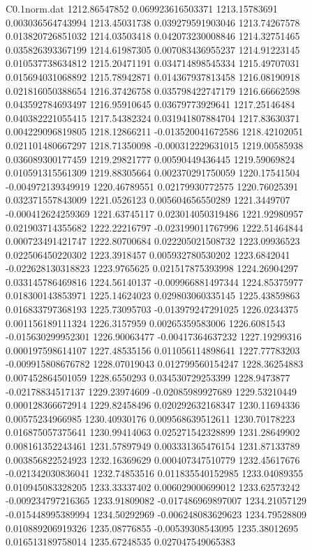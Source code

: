 \begin{filecontents}{C0.1norm.dat}
1212.86547852		0.069923616503371
1213.15783691		0.003036564743994
1213.45031738		0.039279591903046
1213.74267578		0.013820726851032
1214.03503418		0.042073230008846
1214.32751465		0.035826393367199
1214.61987305		0.007083436955237
1214.91223145		0.010537738634812
1215.20471191		0.034714898545334
1215.49707031		0.015694031068892
1215.78942871		0.014367937813458
1216.08190918		0.021816050388654
1216.37426758		0.035798422747179
1216.66662598		0.043592784693497
1216.95910645		0.03679773929641
1217.25146484		0.040382221055415
1217.54382324		0.031941807884704
1217.83630371		0.004229096819805
1218.12866211		-0.013520041672586
1218.42102051		0.021101480667297
1218.71350098		-0.000312229631015
1219.00585938		0.036089300177459
1219.29821777		0.00590449436445
1219.59069824		0.010591315561309
1219.88305664		0.002370291750059
1220.17541504		-0.004972139349919
1220.46789551		0.02179930772575
1220.76025391		0.032371557843009
1221.0526123		0.005604656550289
1221.3449707		-0.000412624259369
1221.63745117		0.023014050319486
1221.92980957		0.021903714355682
1222.22216797		-0.023199011767996
1222.51464844		0.000723491421747
1222.80700684		0.022205021508732
1223.09936523		0.022506450220302
1223.3918457		0.005932780530202
1223.6842041		-0.022628130318823
1223.9765625		0.021517875393998
1224.26904297		0.033145786469816
1224.56140137		-0.009966881497344
1224.85375977		0.018300143853971
1225.14624023		0.029803060335145
1225.43859863		0.016833797368193
1225.73095703		-0.013979247291025
1226.0234375		0.001156189111324
1226.3157959		0.00265359583006
1226.6081543		-0.015630299952301
1226.90063477		-0.00417364637232
1227.19299316		0.000197598614107
1227.48535156		0.011056114898641
1227.77783203		-0.009915808676782
1228.07019043		0.012799560154247
1228.36254883		0.007452864501059
1228.6550293		0.034530729253399
1228.9473877		-0.02178834517137
1229.23974609		-0.02085989927689
1229.53210449		0.000128366672914
1229.82458496		0.020292632168347
1230.11694336		0.00575234966985
1230.40930176		0.009568639512611
1230.70178223		0.016875057375641
1230.99414063		0.025271542328899
1231.28649902		0.008161352243461
1231.57897949		0.003331365476154
1231.87133789		0.003856822524923
1232.16369629		0.000407347510779
1232.45617676		-0.021342030836041
1232.74853516		0.011835540152985
1233.04089355		0.010945083328205
1233.33337402		0.006029000699012
1233.62573242		-0.009234797216365
1233.91809082		-0.017486969897007
1234.21057129		-0.015448995389994
1234.50292969		-0.006248083629623
1234.79528809		0.010889206919326
1235.08776855		-0.00539308543095
1235.38012695		0.016513189758014
1235.67248535		0.027047549065383

\end{filecontents}
